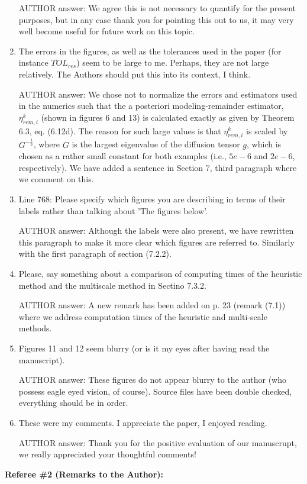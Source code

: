 \documentclass[a4paper,11pt]{scrartcl}
\begin{document}
\begin{enumerate}
AUTHOR answer: We agree this is not necessary to quantify for the present purposes, but in any case thank you for pointing this out to us, it may very well become useful for future work on this topic.

\item
The errors in the figures, as well as the tolerances used in the paper (for instance $TOL_{res}$) seem to be large to me. Perhaps, they are not large relatively. The Authors should put this into its context, I think.

AUTHOR answer: We chose not to normalize the errors and estimators used in the numerics such that the a posteriori modeling-remainder estimator, $\eta_{rem,i}^k$ (shown in figures 6 and 13) is calculated exactly as given by Theorem 6.3, eq. (6.12d). The reason for such large values is that $\eta_{rem,i}^k$ is scaled by $G^{-\frac{1}{2}}$, where $G$ is the largest eigenvalue of the diffusion tensor $g$, which is chosen as a rather small constant for both examples (i.e., $5e-6$ and $2e-6$, respectively). We have added a sentence in Section 7, third paragraph where we comment on this.

\item
Line 768: Please specify which figures you are describing in terms of their labels rather than talking about 'The figures below'.

AUTHOR answer: Although the labels were also present, we have rewritten this paragraph to make it more clear which figures are referred to. Similarly with the first paragraph of section (7.2.2).

\item
Please, say something about a comparison of computing times of the heuristic method and the multiscale method in Sectino 7.3.2.

AUTHOR answer: A new remark has been added on p. 23 (remark (7.1)) where we address computation times of the heuristic and multi-scale methods.

\item
Figures 11 and 12 seem blurry (or is it my eyes after having read the manuscript).

AUTHOR answer: These figures do not appear blurry to the author (who possess eagle eyed vision, of course). Source files have been double checked, everything should be in order.

\item
These were my comments. I appreciate the paper, I enjoyed reading.

AUTHOR answer: Thank you for the positive evaluation of our manuscrupt, we really appreciated your thoughtful comments!
\end{enumerate}
\textbf{Referee \#2  (Remarks to the Author):}\\
\end{document}

